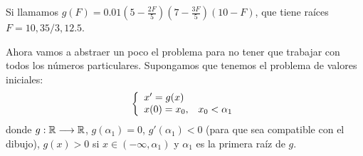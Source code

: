 Si llamamos $g(F)=0.01\left(5-\frac{2F}{5}\right)\left(7-\frac{3F}{5}\right)\left(10-F\right)$, que tiene raíces $F=10,35/3,12.5$. 

\begin{center}
\end{center}

Ahora vamos a abstraer un poco el problema para no tener que trabajar con todos los números particulares. Supongamos que tenemos el problema de valores iniciales:
\[
\left\{
\begin{array}{l}
x'=g(x) \\
x(0)=x_0, \;\;\; x_0<\alpha_1
\end{array}
\right.
\]
donde $g : \mathbb{R} \longrightarrow \mathbb{R}$, $g(\alpha_1)=0$, $g'(\alpha_1)<0$ (para que sea compatible con el dibujo), $g(x)>0$ si $x\in(-\infty, \alpha_1)$ y $\alpha_1$ es la primera raíz de $g$. 

